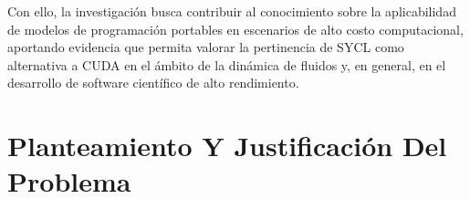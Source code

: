 \documentclass[12pt]{article}
\begin{document}
Con ello, la investigación busca contribuir al conocimiento sobre la aplicabilidad de modelos de programación portables en escenarios de alto costo computacional, aportando evidencia que permita valorar la pertinencia de SYCL como alternativa a CUDA en el ámbito de la dinámica de fluidos y, en general, en el desarrollo de software científico de alto rendimiento.



%     

%     






\section{Planteamiento Y Justificación Del Problema}
\end{document}
